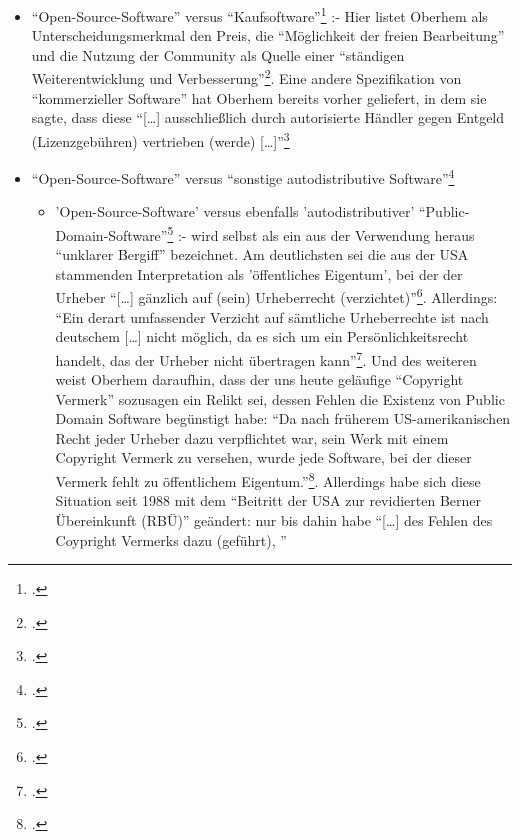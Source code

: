 \documentclass[DIV=calc,BCOR=5mm,11pt,headings=small,oneside,abstract=true, toc=bib]{scrartcl}
\begin{document}
\begin{itemize}
  \item \enquote{Open-Source-Software} versus
  \enquote{Kaufsoftware}\footcite[vgl.][27f]{Oberhem2008a} :- Hier listet
  Oberhem als Unterscheidungsmerkmal den Preis, die \enquote{Möglichkeit
  der freien Bearbeitung} und die Nutzung der Community als Quelle einer
  \enquote{ständigen Weiterentwicklung und
  Verbesserung}\footcite[vgl.][28. So intutitiv passend die
  Unterschiedung in kommerzielle Software und nicht kommerzielle
  Software auch sein mag, so sehr wird noch zu überlegen sein, ob die hier
  genannten Kriterien eine Systematik wirklich tragen]{Oberhem2008a}. Eine
  andere Spezifikation von \enquote{kommerzieller Software} hat Oberhem
  bereits vorher geliefert, in dem sie sagte, dass diese \enquote{[\ldots]
  ausschließlich durch autorisierte Händler gegen Entgeld
  (Lizenzgebühren) vertrieben (werde)
  [\ldots]}\footcite[vgl.][6]{Oberhem2008a}
  \item \enquote{Open-Source-Software} versus \enquote{sonstige
  autodistributive Software}\footcite[vgl.][28ff]{Oberhem2008a}
  \begin{itemize}
    \item 'Open-Source-Software' versus ebenfalls 'autodistributiver'
    \enquote{Public-Domain-Software}\footcite[vgl.][29]{Oberhem2008a} :-
    wird selbst als ein aus der Verwendung heraus \enquote{unklarer Bergiff}
    bezeichnet. Am deutlichsten sei die aus der USA stammenden Interpretation
    als 'öffentliches Eigentum', bei der der Urheber \enquote{[\ldots]
    gänzlich auf (sein) Urheberrecht
    (verzichtet)}\footcite[vgl.][30]{Oberhem2008a}. Allerdings: \enquote{Ein
    derart umfassender Verzicht auf sämtliche Urheberrechte ist nach deutschem
    [\ldots] nicht möglich, da es sich um ein Persönlichkeitsrecht handelt, das
    der Urheber nicht übertragen kann}\footcite[][30]{Oberhem2008a}. Und
    des weiteren weist Oberhem daraufhin, dass der uns heute geläufige
    \enquote{Copyright Vermerk} sozusagen ein Relikt sei, dessen Fehlen die
    Existenz von Public Domain Software begünstigt habe: \enquote{Da nach
    früherem US-amerikanischen Recht jeder Urheber dazu verpflichtet war,
    sein Werk mit einem Copyright Vermerk zu versehen, wurde jede
    Software, bei der dieser Vermerk fehlt zu öffentlichem
    Eigentum.}\footcite[][30]{Oberhem2008a}. Allerdings habe sich diese
    Situation seit 1988 mit dem \enquote{Beitritt der USA zur revidierten
    Berner Übereinkunft (RBÜ)} geändert: nur bis dahin habe
    \enquote{[\ldots] des Fehlen des Coypright Vermerks dazu (geführt),
}
\end{itemize}
\end{itemize}
\end{document}
